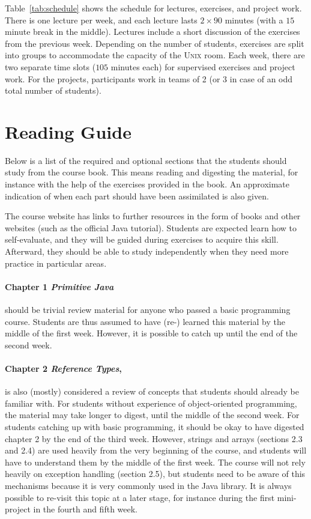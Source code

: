 \documentclass[a4paper,twoculumn,10pt]{article}
\begin{document}
Table~\ref{tab:schedule} shows the schedule for lectures, exercises, and project work.
There is one lecture per week, and each lecture lasts $2\times 90$ minutes (with a $15$ minute break in the middle).
Lectures include a short discussion of the exercises from the previous week.
Depending on the number of students, exercises are split into groups to accommodate the capacity of the \textsc{Unix} room.
Each week, there are two separate time slots ($105$ minutes each) for supervised exercises and project work.
For the projects, participants work in teams of 2 (or 3 in case of an odd total number of students).



\section{Reading Guide}

Below is a list of the required and optional sections that the students should study from the course book.
This means reading and digesting the material, for instance with the help of the exercises provided in the book.
An approximate indication of when each part should have been assimilated is also given.

The course website has links to further resources in the form of books and other websites (such as the official Java tutorial).
Students are expected learn how to self-evaluate, and they will be guided during exercises to acquire this skill.
Afterward, they should be able to study independently when they need more practice in particular areas.

\paragraph{Chapter 1 \emph{Primitive Java}} should be trivial review material for anyone who passed a basic programming course.
Students are thus assumed to have (re-) learned this material by the middle of the first week.
However, it is possible to catch up until the end of the second week.

\paragraph{Chapter 2 \emph{Reference Types},} is also (mostly) considered a review of concepts that students should already be familiar with.
For students without experience of object-oriented programming, the material may take longer to digest, until the middle of the second week.
For students catching up with basic programming, it should be okay to have digested chapter 2 by the end of the third week.
However, strings and arrays (sections 2.3 and 2.4) are used heavily from the very beginning of the course, and students will have to understand them by the middle of the first week.
The course will not rely heavily on exception handling (section 2.5), but students need to be aware of this mechanisms because it is very commonly used in the Java library.
It is always possible to re-visit this topic at a later stage, for instance during the first mini-project in the fourth and fifth week.
\end{document}
